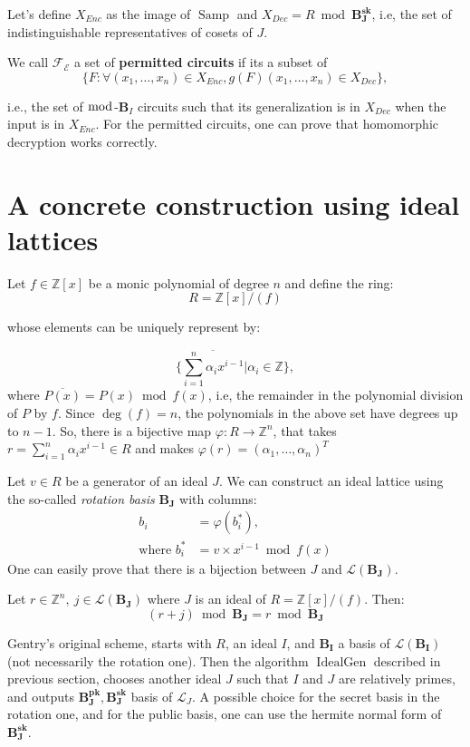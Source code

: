 Let's define $X_{Enc}$ as the image of $\operatorname{Samp}$ and $X_{Dec}=R\bmod\mathbf{B_J^{sk}}$, i.e, the set of indistinguishable representatives of cosets of $J$.

We call $\mathcal{F_E}$ a set of \textbf{permitted circuits} if its a subset of
$$\{F:\forall (x_1,\ldots,x_n)\in X_{Enc}, g(F)(x_1,\ldots,x_n)\in X_{Dec}\},$$

i.e., the set of $\bmod$-$\mathbf B_I$ circuits such that its generalization is in $X_{Dec}$ when the input is in $X_{Enc}$. For the permitted circuits, one can prove that homomorphic decryption works correctly.

\section{A concrete construction using ideal lattices}

Let $f\in\mathbb{Z}[x]$ be a monic polynomial of degree $n$ and define the ring:
$$R=\mathbb{Z}[x]/(f)$$

whose elements can be uniquely represent by:

$$\Big\{\overline{\displaystyle\sum_{i=1}^{n}\alpha_ix^{i-1}}|\alpha_i\in\mathbb Z\Big\},$$
where $\overline{P(x)}=P(x)\bmod f(x)$, i.e, the remainder in the polynomial division of $P$ by $f$. Since $\deg(f)=n$, the polynomials in the above set have degrees up to $n-1$. So, there is a bijective map $\varphi:R\to\mathbb{Z}^n$, that takes $r=\sum_{i=1}^{n}\alpha_ix^{i-1}\in R$ and makes $\varphi(r)=(\alpha_1,\ldots,\alpha_n)^T$

Let $v\in R$ be a generator of an ideal $J$. We can construct an ideal lattice using the so-called \textit{rotation basis} $\mathbf{B_J}$ with columns: 
\begin{align*}
    b_i&=\varphi(b_i^*),\\ 
    \text{where } b_i^*&=v\times x^{i-1}\bmod f(x)
\end{align*}
One can easily prove that there is a bijection between $J$ and $\mathcal{L}(\mathbf{B_J})$.
\begin{lemma}
\label{reduction}
Let $r\in\mathbb{Z}^n,~j\in\mathcal{L}(\mathbf{B_J})$ where $J$ is an ideal of $R=\mathbb{Z}[x]/(f)$. Then:
$$(r+j)\bmod \mathbf{B_J}=r\bmod \mathbf{B_J}$$
\end{lemma}

Gentry's original scheme, starts with $R$, an ideal $I$, and $\mathbf{B_I}$ a basis of $\mathcal{L}(\mathbf{B_I})$ (not necessarily the rotation one). Then the algorithm $\operatorname{IdealGen}$ described in previous section, chooses another ideal $J$ such that $I$ and $J$ are relatively primes, and outputs $\mathbf{B_J^{pk}},\mathbf{B_J^{sk}}$ basis of $\mathcal{L}_J$. A possible choice for the secret basis in the rotation one, and for the public basis, one can use the hermite normal form of $\mathbf{B_J^{sk}}$. 

